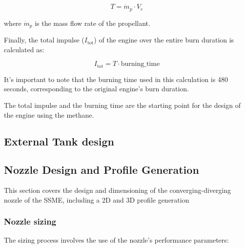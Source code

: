 \[
 T = \dot{m}_{p} \cdot V_{e}
\]

where \( \dot{m}_{p} \) is the mass flow rate of the propellant.

Finally, the total impulse (\( I_{\text{tot}} \)) of the engine over the entire burn duration is calculated as:

\[
I_{\text{tot}} = T \cdot \text{burning\_time}
\]

It's important to note that the burning time used in this calculation is 480 seconds, corresponding to the original engine's burn duration.

The total impulse and the burning time are the starting point for the design of the engine using the methane.

\subsection{External Tank design}

\subsection{Nozzle Design and Profile Generation}
This section covers the design and dimensioning of the converging-diverging nozzle of the SSME, including a 2D and 3D profile generation
\subsubsection{Nozzle sizing}
The sizing process involves the use of the nozzle's performance parameters:


